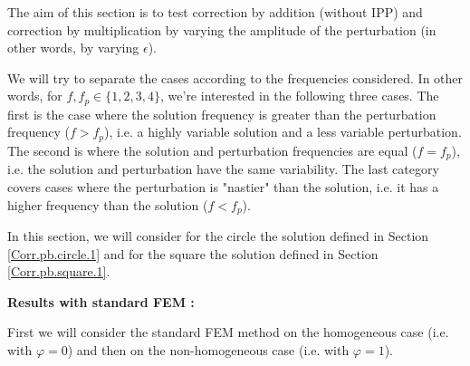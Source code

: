 The aim of this section is to test correction by addition (without IPP) and correction by multiplication by varying the amplitude of the perturbation (in other words, by varying $\epsilon$). 

We will try to separate the cases according to the frequencies considered. In other words, for $f,f_p\in\{1,2,3,4\}$, we're interested in the following three cases. The first is the case where the solution frequency is greater than the perturbation frequency ($f>f_p$), i.e. a highly variable solution and a less variable perturbation. The second is where the solution and perturbation frequencies are equal ($f=f_p$), i.e. the solution and perturbation have the same variability. The last category covers cases where the perturbation is "nastier" than the solution, i.e. it has a higher frequency than the solution ($f<f_p$). 

In this section, we will consider for the circle the solution defined in Section \ref{Corr.pb.circle.1} and for the square the solution defined in Section \ref{Corr.pb.square.1}.

\textbf{Results with standard FEM :}

First we will consider the standard FEM method on the homogeneous case (i.e. with $\varphi=0$) and then on the non-homogeneous case (i.e. with $\varphi=1$).

